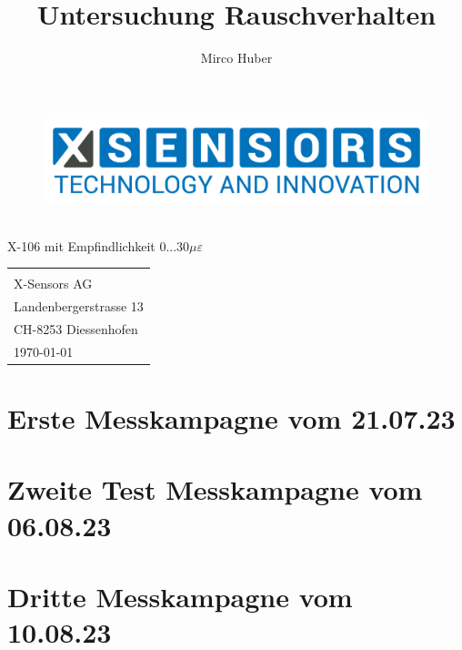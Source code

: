 \documentclass[12pt,a4paper]{report}
\author{Mirco Huber}
\title{Untersuchung Rauschverhalten}
\newcommand{\subtitle}{X-106 mit Empfindlichkeit 0...30$\mu\varepsilon$}
\begin{document}
	\thispagestyle{empty}
	\begin{titlepage}
		\begin{figure}[H]
			\centering
			\includegraphics[width=.5\linewidth]{Logos/X-SENSORS-Logo_Slogan_EN_Transparent.png}
		\end{figure}
		\vspace*{3cm}
		\begin{center}
			\Huge {\thetitle} \\\vspace*{.5cm}
			\small {\subtitle}
		\end{center}
		\vspace{12cm}
		\hspace{.6\linewidth} 
		\begin{tabular}{l}	
			\small{\theauthor} \\[.5pt]  
			\small{X-Sensors AG} \\ 
			\small{Landenbergerstrasse 13} \\
			\small{CH-8253 Diessenhofen} \\ [.5cm] 	
			\today
		\end{tabular}
	\end{titlepage}
	\thispagestyle{empty}
	\tableofcontents
	\thispagestyle{empty}
	\listoffigures
	\listoftables
	\thispagestyle{empty}
	\clearpage
	\newpage
	\setcounter{page}{1}
	\pagestyle{fancy}
	
	
	
	
	\chapter{Erste Messkampagne vom 21.07.23}
	
	
	\newpage
	\chapter{Zweite Test Messkampagne vom 06.08.23}
	
	\newpage
	\chapter{Dritte Messkampagne vom 10.08.23}
	
\end{document}
